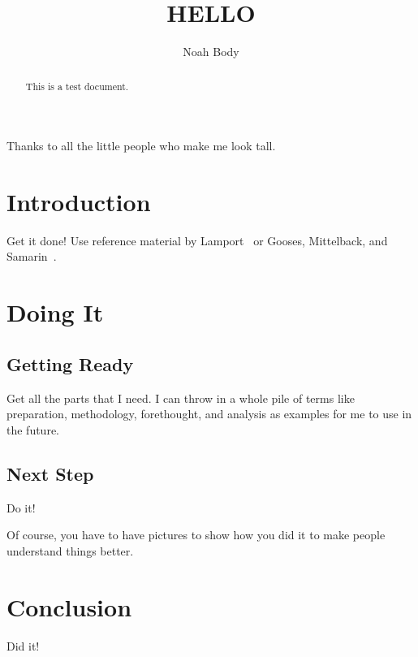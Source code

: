 \documentclass[12pt,glossary]{dalthesis}
\begin{document}
\mcs  %
\title{HELLO}
\author{Noah Body}



\nolistoftables
\nolistoffigures

\frontmatter

\begin{abstract}
This is a test document.
\end{abstract}

\printglossary

\begin{acknowledgements}
Thanks to all the little people who make me look tall.
\end{acknowledgements}

\mainmatter

\chapter{Introduction}

Get it done!  Use reference material by Lamport~\cite{latex-by-lamport} or
Gooses, Mittelback, and Samarin~\cite{latex-companion}.

\chapter{Doing It}

\section{Getting Ready}

Get all the parts that I need.  I can throw in a whole pile of terms like
preparation,
methodology,
forethought,
and
analysis
as examples for me to use in the future.

\section{Next Step}

Do it!

Of course, you have to have pictures to show how you did it to make people
understand things better.

\chapter{Conclusion}

Did it!



\end{document}
